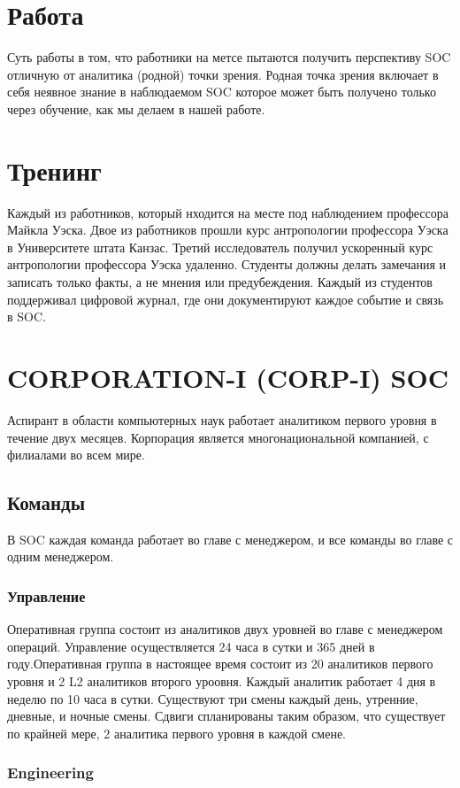 \documentclass[12pt,]{article}
\begin{document}
\section{Работа}
Суть работы в том, что работники на метсе пытаются получить перспективу SOC отличную от аналитика (родной) точки зрения. Родная точка зрения включает в себя неявное знание в наблюдаемом SOC которое может быть получено только через обучение, как мы делаем в нашей работе.

\section{Тренинг}

Каждый из работников, который нходится на месте под наблюдением профессора Майкла Уэска.
Двое из работников прошли курс антропологии профессора Уэска в Университете штата Канзас. Третий исследователь получил ускоренный курс антропологии профессора Уэска удаленно. Студенты должны делать замечания и записать только факты, а не мнения или предубеждения.
Каждый из студентов поддерживал цифровой журнал, где они документируют каждое событие и связь в SOC.

\section{CORPORATION-I (CORP-I) SOC}
Аспирант в области компьютерных наук работает аналитиком первого уровня в течение двух месяцев. Корпорация является многонациональной компанией, с филиалами во всем мире.
\subsection{Команды}
В SOC каждая команда работает во главе с менеджером, и все команды во главе с одним менеджером.
\subsubsection{Управление}
Оперативная группа состоит из  аналитиков двух уровней во главе с менеджером операций. Управление осуществляется 24 часа в сутки и 365 дней в году.Оперативная группа в настоящее время состоит из
20 аналитиков первого уровня и 2 L2 аналитиков второго уроовня.  Каждый аналитик работает 4 дня в неделю по 10 часа в сутки. Существуют три смены каждый день, утренние, дневные, и ночные смены. Сдвиги спланированы таким образом, что существует по крайней мере, 2 аналитика первого уровня в каждой смене.
\subsubsection{Engineering}
\end{document}
